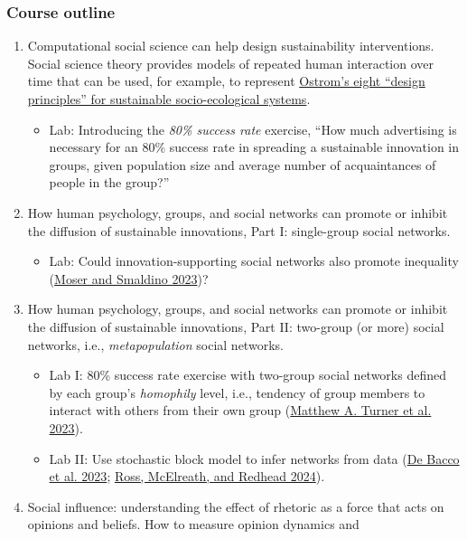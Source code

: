\documentclass[letterpaper]{article}
\providecommand{\tightlist}{%
  \setlength{\itemsep}{0pt}\setlength{\parskip}{0pt}}
\begin{document}
\subsubsection{Course outline}\label{course-outline}

\begin{enumerate}
\def\labelenumi{\arabic{enumi}.}
\item
  Computational social science can help design sustainability
  interventions. Social science theory provides models of repeated human
  interaction over time that can be used, for example, to represent
  \href{https://earthbound.report/2018/01/15/elinor-ostroms-8-rules-for-managing-the-commons/}{Ostrom's
  eight ``design principles'' for sustainable socio-ecological systems}.

  \begin{itemize}
  \tightlist
  \item
    Lab: Introducing the \emph{80\% success rate} exercise, ``How much
    advertising is necessary for an 80\% success rate in spreading a
    sustainable innovation in groups, given population size and average
    number of acquaintances of people in the group?''
  \end{itemize}
\item
  How human psychology, groups, and social networks can promote or
  inhibit the diffusion of sustainable innovations, Part I: single-group
  social networks.

  \begin{itemize}
  \tightlist
  \item
    Lab: Could innovation-supporting social networks also promote
    inequality {(\hyperref[ref-Moser2023]{Moser and Smaldino 2023})}?
  \end{itemize}
\item
  How human psychology, groups, and social networks can promote or
  inhibit the diffusion of sustainable innovations, Part II: two-group
  (or more) social networks, i.e., \emph{metapopulation} social
  networks.

  \begin{itemize}
  \item
    Lab I: 80\% success rate exercise with two-group social networks
    defined by each group's \emph{homophily} level, i.e., tendency of
    group members to interact with others from their own group
    {(\hyperref[ref-Turner2023]{Matthew A. Turner et al. 2023})}.
  \item
    Lab II: Use stochastic block model to infer networks from data
    {(\hyperref[ref-DeBacco2023]{De Bacco et al. 2023};
    \hyperref[ref-Ross2024]{Ross, McElreath, and Redhead 2024})}.
  \end{itemize}
\item
  Social influence: understanding the effect of rhetoric as a force that
  acts on opinions and beliefs. How to measure opinion dynamics and


\end{enumerate}
\end{document}
